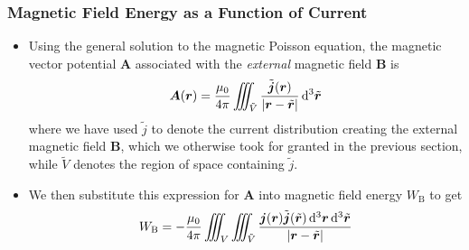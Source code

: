 \documentclass[11pt, a4paper]{article}
\newcommand{\diff}{\mathop{}\!\mathrm{d}} %
\newcommand{\dr}{\diff^{3} \r}  %
\newcommand{\dtr}{\diff^{3} \tilde{\r}}  %
\renewcommand{\vec}[1]{\bm{#1}} %
\renewcommand{\t}[1]{\tilde{#1}} %
\renewcommand{\r}{\vec{r}}
\newcommand{\B}{\vec{B}} %
\newcommand{\A}{\vec{A}} %
\newcommand{\mm}{\mu_{0}}  %
\renewcommand{\j}{\vec{j}}  %
\begin{document}
\subsubsection{Magnetic Field Energy as a Function of Current}
\begin{itemize}
	\item Using the general solution to the magnetic Poisson equation, the magnetic vector potential $ \A $ associated with the \textit{external} magnetic field $ \B $ is
	\begin{equation*}
		\A(\r) = \frac{\mm}{4\pi}\iiint_{\tilde{V}}\frac{\t{\j}(\r)}{\abs{\r - \t{\r}}} \dtr
	\end{equation*}
    where we have used $ \tilde{j} $ to denote the current distribution creating the external magnetic field $ \B $, which we otherwise took for granted in the previous section, while $ \tilde{V} $ denotes the region of space containing $ \tilde{j} $.

    \item We then substitute this expression for $ \A $ into magnetic field energy $ W_{\mathrm{B}} $ to get
	\begin{equation*}
		W_{\mathrm{B}} = - \frac{\mm}{4\pi} \iiint_{V} \iiint_{\t{V}} \frac{\j(\r) \t{\j}(\t{\r}) \dr \dtr}{\abs{\r - \t{\r}}}
	\end{equation*}
\end{itemize}
\end{document}
